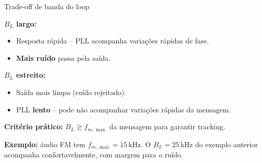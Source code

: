 \begin{frame}{Trade-off de banda do loop}

\textbf{$B_L$ largo:}
\begin{itemize}\itemsep0pt
\item Resposta rápida -- PLL acompanha variações rápidas de fase.
\item \textbf{Mais ruído} passa pela saída.
\end{itemize}

\pause
\vspace{0.3cm}
\textbf{$B_L$ estreito:}
\begin{itemize}\itemsep0pt
\item Saída mais limpa (ruído rejeitado).
\item PLL \textbf{lento} -- pode não acompanhar variações rápidas da mensagem.
\end{itemize}

\pause
\vspace{0.3cm}
\textbf{Critério prático:} $B_L \gtrsim f_{m,\max}$ da mensagem para garantir tracking.

\textbf{Exemplo:} áudio FM tem $f_{m,\max} = 15$\,kHz. O $B_L = 25$\,kHz do exemplo anterior acompanha confortavelmente, com margem para o ruído.

\end{frame}



